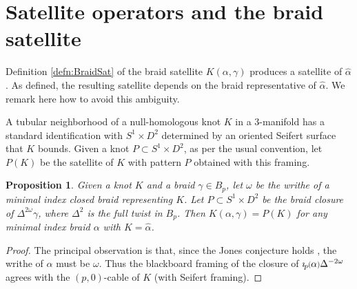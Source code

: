 \documentclass[11pt]{amsart}
\def\C{{\mathbb C}}
\def\A{{\mathcal A}}
\newcommand*{\smallp}[1]{\scalebox{.75}{\ensuremath#1}}
\newcommand{\pp}[2][p]{\imath_{\hspace*{-1pt}#1}\hspace*{-.5pt}\smallp(#2\smallp)}
\newtheorem{prop}[thm]{Proposition}
\newtheorem{cor}[thm]{Corollary}
\theoremstyle{definition}
\begin{document}












\section{Satellite operators and the braid satellite}
\label{SecAsSatelliteOp}

Definition \ref{defn:BraidSat} of the braid satellite $K(\alpha,\gamma)$ produces a satellite of $\hat{\alpha}$. As defined, the resulting satellite depends on the braid representative of $\hat{\alpha}$. We remark here how to avoid this ambiguity.

A tubular neighborhood of a null-homologous knot $K$ in a 3-manifold has a standard identification with $S^1\times D^2$ determined by an oriented Seifert surface that $K$ bounds. Given a knot $P\subset S^1\times D^2$, as per the usual convention, let $P(K)$ be the satellite of $K$ with pattern $P$ obtained with this framing.

\begin{prop}\label{PropAsSatelliteOp}Given a knot $K$ and a braid $\gamma\in B_p$, let $\omega$ be the writhe of a minimal index closed braid representing $K$. Let $P\subset S^1\times D^2$ be the braid closure of $\Delta^{2\omega}\gamma$, where $\Delta^2$ is the full twist in $B_p$. Then $K(\alpha,\gamma) = P(K)$ for any minimal index braid $\alpha$ with $K=\hat{\alpha}$.
\end{prop}
\begin{proof}The principal observation is that, since the Jones conjecture holds \cite{DP12,LM12}, the writhe of $\alpha$ must be $\omega$. Thus the blackboard framing of the closure of $\pp\alpha\Delta^{-2\omega}$ agrees with the $(p,0)$-cable of $K$ (with Seifert framing).
\end{proof}
\end{document}
